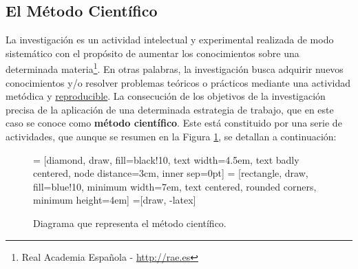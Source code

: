 \subsection{El Método Científico}\label{tfx_inv_s_met_cientifico}

La investigación es un actividad intelectual y experimental realizada de modo sistemático con el propósito de aumentar los conocimientos sobre una determinada materia\footnote{Real Academia Española - \url{http://rae.es}}. En otras palabras, la investigación busca adquirir nuevos conocimientos y/o resolver problemas teóricos o prácticos mediante una actividad metódica y \underline {reproducible}. La consecución de los objetivos de la investigación precisa de la aplicación de una determinada estrategia de trabajo, que en este caso se conoce como \textbf{método científico}. Este está constituido por una serie de actividades, que aunque se resumen en la Figura \ref{fg_met_cientifico}, se detallan a continuación:

\begin{figure}[!t]
    \centering
    \usetikzlibrary {shapes.geometric}
     = [diamond, draw, fill=black!10, text width=4.5em, text badly centered, node distance=3cm, inner sep=0pt]
     = [rectangle, draw, fill=blue!10, minimum width=7em, text centered, rounded corners, minimum height=4em]
    =[draw, -latex]
    

    \caption{Diagrama que representa el método científico.}\label{fg_met_cientifico}%
\end{figure}

